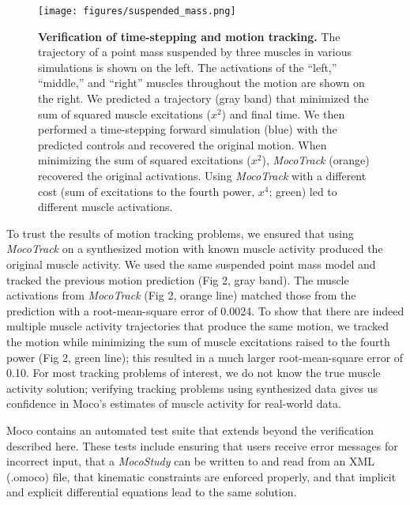 \documentclass[10pt,letterpaper]{article}
\begin{document}
\begin{figure}[!h]
        \centering
        \texttt{[image: figures/suspended\_mass.png]}
        \caption{{\bf Verification of time-stepping and motion tracking.}
        The trajectory of a point mass suspended by three muscles in various simulations is shown on the left. The activations of the  “left,” “middle,” and “right” muscles throughout the motion are shown on the right. We predicted a trajectory (gray band) that minimized the sum of squared muscle excitations ($x^2$) and final time. We then performed a time-stepping forward simulation (blue) with the predicted controls and recovered the original motion. When minimizing the sum of squared excitations ($x^2$), \textit{MocoTrack} (orange) recovered the original activations. Using \textit{MocoTrack} with a different cost (sum of excitations to the fourth power, $x^4$; green) led to different muscle activations.}
        \label{verification}
\end{figure}

To trust the results of motion tracking problems, we ensured that using \textit{MocoTrack} on a synthesized motion with known muscle activity produced the original muscle activity. We used the same suspended point mass model and tracked the previous motion prediction (Fig 2, gray band). The muscle activations from \textit{MocoTrack} (Fig 2, orange line) matched those from the prediction with a root-mean-square error of 0.0024. To show that there are indeed multiple muscle activity trajectories that produce the same motion, we tracked the motion while minimizing the sum of muscle excitations raised to the fourth power (Fig 2, green line); this resulted in a much larger root-mean-square error of 0.10. For most tracking problems of interest, we do not know the true muscle activity solution; verifying tracking problems using synthesized data gives us confidence in Moco’s estimates of muscle activity for real-world data.

Moco contains an automated test suite that extends beyond the verification described here. These tests include ensuring that users receive error messages for incorrect input, that a \textit{MocoStudy} can be written to and read from an XML (.omoco) file, that kinematic constraints are enforced properly, and that implicit and explicit differential equations lead to the same solution.
\end{document}
